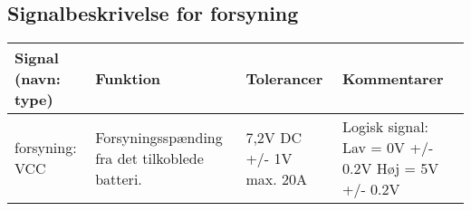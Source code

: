 \subsection{Signalbeskrivelse for forsyning}

\begin{table}[h]
	\centering
	\begin{tabularx}{\textwidth}{|l|X|X|X|} \hline
	\textbf{Signal (navn: type)} & \textbf{Funktion} & \textbf{Tolerancer} & \textbf{Kommentarer} \\ \hline
forsyning: VCC
	& Forsyningsspænding fra det tilkoblede batteri. 
	& 7,2V DC +/- 1V max. 20A

 	& Logisk signal: \newline
		Lav = 0V +/- 0.2V \newline
		Høj = 5V +/- 0.2V
	\\ \hline
	
	\end{tabularx}
\end{table}